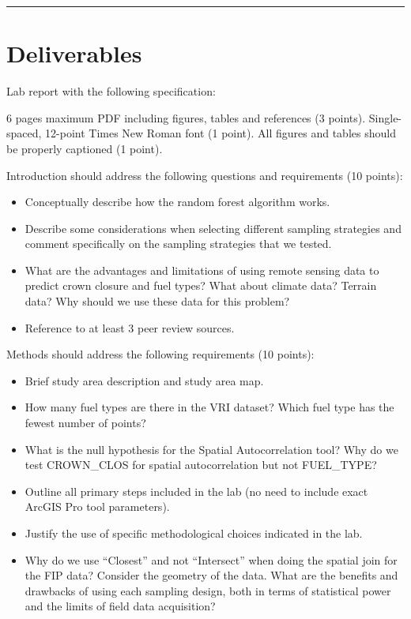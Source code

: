 \documentclass[
]{book}
\begin{document}
\begin{center}\rule{0.5\linewidth}{0.5pt}\end{center}

\hypertarget{lab4-deliverables}{%
\section*{Deliverables}\label{lab4-deliverables}}

Lab report with the following specification:

6 pages maximum PDF including figures, tables and references (3 points). Single-spaced, 12-point Times New Roman font (1 point). All figures and tables should be properly captioned (1 point).

Introduction should address the following questions and requirements (10 points):

\begin{itemize}
\item
  Conceptually describe how the random forest algorithm works.
\item
  Describe some considerations when selecting different sampling strategies and comment specifically on the sampling strategies that we tested.
\item
  What are the advantages and limitations of using remote sensing data to predict crown closure and fuel types? What about climate data? Terrain data? Why should we use these data for this problem?
\item
  Reference to at least 3 peer review sources.
\end{itemize}

Methods should address the following requirements (10 points):

\begin{itemize}
\item
  Brief study area description and study area map.
\item
  How many fuel types are there in the VRI dataset? Which fuel type has the fewest number of points?
\item
  What is the null hypothesis for the Spatial Autocorrelation tool? Why do we test CROWN\_CLOS for spatial autocorrelation but not FUEL\_TYPE?
\item
  Outline all primary steps included in the lab (no need to include exact ArcGIS Pro tool parameters).
\item
  Justify the use of specific methodological choices indicated in the lab.
\item
  Why do we use ``Closest'' and not ``Intersect'' when doing the spatial join for the FIP data? Consider the geometry of the data. What are the benefits and drawbacks of using each sampling design, both in terms of statistical power and the limits of field data acquisition?
\end{itemize}
\end{document}

